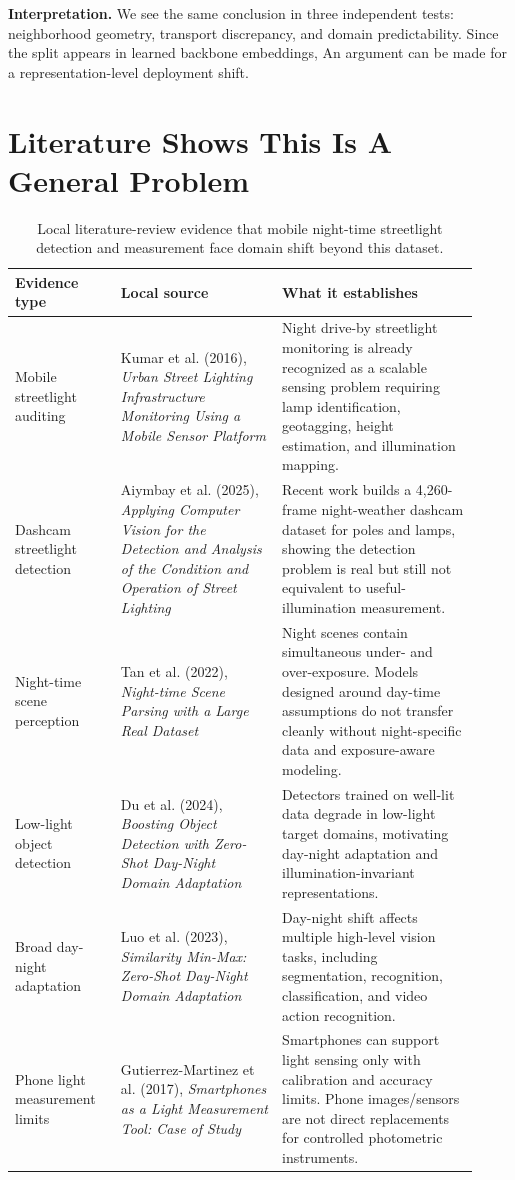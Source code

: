 \documentclass[10pt]{article}
\begin{document}
\textbf{Interpretation.}
We see the same conclusion in three independent tests: neighborhood geometry, transport discrepancy, and domain predictability. Since the split appears in learned backbone embeddings, An argument can be made for a representation-level deployment shift.

\section{Literature Shows This Is A General Problem}

\begin{table}[H]
\centering
\caption{Local literature-review evidence that mobile night-time streetlight detection and measurement face domain shift beyond this dataset.}
\scriptsize
\begin{tabular}{>{\raggedright\arraybackslash}p{0.21\linewidth}>{\raggedright\arraybackslash}p{0.32\linewidth}>{\raggedright\arraybackslash}p{0.39\linewidth}}
\toprule
Evidence type & Local source & What it establishes\\
\midrule
Mobile streetlight auditing & Kumar et al. (2016), \textit{Urban Street Lighting Infrastructure Monitoring Using a Mobile Sensor Platform} & Night drive-by streetlight monitoring is already recognized as a scalable sensing problem requiring lamp identification, geotagging, height estimation, and illumination mapping.\\
Dashcam streetlight detection & Aiymbay et al. (2025), \textit{Applying Computer Vision for the Detection and Analysis of the Condition and Operation of Street Lighting} & Recent work builds a 4,260-frame night-weather dashcam dataset for poles and lamps, showing the detection problem is real but still not equivalent to useful-illumination measurement.\\
Night-time scene perception & Tan et al. (2022), \textit{Night-time Scene Parsing with a Large Real Dataset} & Night scenes contain simultaneous under- and over-exposure. Models designed around day-time assumptions do not transfer cleanly without night-specific data and exposure-aware modeling.\\
Low-light object detection & Du et al. (2024), \textit{Boosting Object Detection with Zero-Shot Day-Night Domain Adaptation} & Detectors trained on well-lit data degrade in low-light target domains, motivating day-night adaptation and illumination-invariant representations.\\
Broad day-night adaptation & Luo et al. (2023), \textit{Similarity Min-Max: Zero-Shot Day-Night Domain Adaptation} & Day-night shift affects multiple high-level vision tasks, including segmentation, recognition, classification, and video action recognition.\\
Phone light measurement limits & Gutierrez-Martinez et al. (2017), \textit{Smartphones as a Light Measurement Tool: Case of Study} & Smartphones can support light sensing only with calibration and accuracy limits. Phone images/sensors are not direct replacements for controlled photometric instruments.\\
\bottomrule
\end{tabular}
\end{table}
\end{document}
